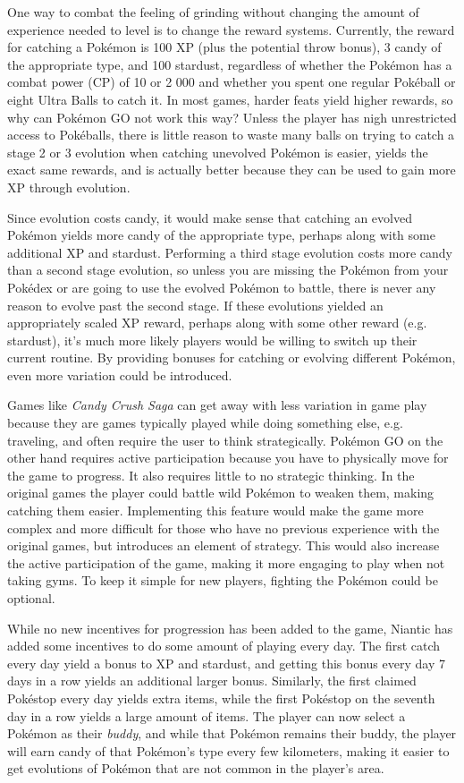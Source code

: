 One way to combat the feeling of grinding without changing the amount of experience needed to level is to change the reward systems. Currently, the reward for catching a Pokémon is 100 XP (plus the potential throw bonus), 3 candy of the appropriate type, and 100 stardust, regardless of whether the Pokémon has a combat power (CP) of 10 or 2 000 and whether you spent one regular Pokéball or eight Ultra Balls to catch it. In most games, harder feats yield higher rewards, so why can Pokémon GO not work this way? Unless the player has nigh unrestricted access to Pokéballs, there is little reason to waste many balls on trying to catch a stage 2 or 3 evolution when catching unevolved Pokémon is easier, yields the exact same rewards, and is actually better because they can be used to gain more XP through evolution.

Since evolution costs candy, it would make sense that catching an evolved Pokémon yields more candy of the appropriate type, perhaps along with some additional XP and stardust. Performing a third stage evolution costs more candy than a second stage evolution, so unless you are missing the Pokémon from your Pokédex or are going to use the evolved Pokémon to battle, there is never any reason to evolve past the second stage. If these evolutions yielded an appropriately scaled XP reward, perhaps along with some other reward (e.g. stardust), it's much more likely players would be willing to switch up their current routine. By providing bonuses for catching or evolving different Pokémon, even more variation could be introduced.

Games like \emph{Candy Crush Saga} can get away with less variation in game play because they are games typically played while doing something else, e.g. traveling, and often require the user to think strategically. Pokémon GO on the other hand requires active participation because you have to physically move for the game to progress. It also requires little to no strategic thinking. In the original games the player could battle wild Pokémon to weaken them, making catching them easier. Implementing this feature would make the game more complex and more difficult for those who have no previous experience with the original games, but introduces an element of strategy. This would also increase the active participation of the game, making it more engaging to play when not taking gyms. To keep it simple for new players, fighting the Pokémon could be optional.

While no new incentives for progression has been added to the game, Niantic has added some incentives to do some amount of playing every day. The first catch every day yield a bonus to XP and stardust, and getting this bonus every day 7 days in a row yields an additional larger bonus. Similarly, the first claimed Pokéstop every day yields extra items, while the first Pokéstop on the seventh day in a row yields a large amount of items. The player can now select a Pokémon as their \emph{buddy}, and while that Pokémon remains their buddy, the player will earn candy of that Pokémon's type every few kilometers, making it easier to get evolutions of Pokémon that are not common in the player's area.

